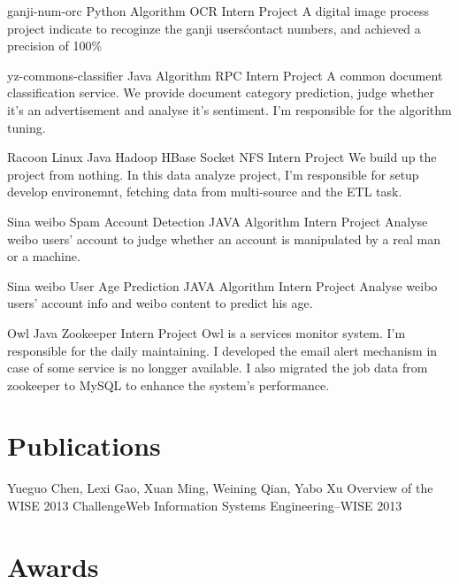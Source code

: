 \documentclass[11pt,a4paper]{moderncv}
\begin{document}
\vspace*{0.2\baselineskip}
{ganji-num-orc}
{Python Algorithm OCR}
{Intern Project}{}
{A digital image process project indicate to recoginze the ganji users\' contact numbers, and achieved a precision of 100\%}


\vspace*{0.2\baselineskip}
{yz-commons-classifier}
{Java Algorithm RPC}
{Intern Project}{}
{A common document classification service. We provide document category prediction, judge whether it's an advertisement and analyse it's sentiment. I'm responsible for the algorithm tuning.}


\vspace*{0.2\baselineskip}
{Racoon}
{Linux Java Hadoop HBase Socket NFS}
{Intern Project}{}
{We build up the project from nothing. In this data analyze project, I'm responsible for setup develop environemnt, fetching data from multi-source and the ETL task.}


\vspace*{0.2\baselineskip}
{Sina weibo Spam Account Detection}
{JAVA Algorithm}
{Intern Project}{}
{Analyse weibo users' account to judge whether an account is manipulated by a real man or a machine.}


\vspace*{0.2\baselineskip}
{Sina weibo User Age Prediction}
{JAVA Algorithm}
{Intern Project}{}
{Analyse weibo users' account info and weibo content to predict his age.}


\vspace*{0.2\baselineskip}
{Owl}
{Java Zookeeper}
{Intern Project}{}
{Owl is a services monitor system. I'm responsible for the daily maintaining. I developed the email alert mechanism in case of some service is no longger available. I also migrated the job data from zookeeper to MySQL to enhance the system's performance.}

\renewcommand{\baselinestretch}{1.0}

\section{Publications}
{\textnormal{Yueguo Chen, Lexi Gao, }Xuan Ming\textnormal{, Weining Qian, Yabo Xu}}
{Overview of the WISE 2013 Challenge}{Web Information Systems Engineering–WISE 2013}
{}{}{}

\section{Awards}
\end{document}
